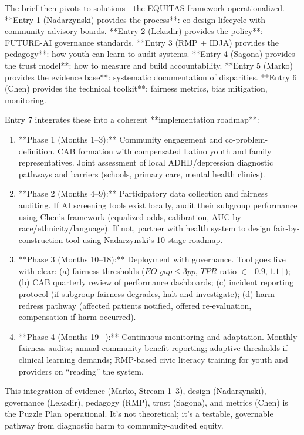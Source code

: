 \documentclass[12pt,twoside]{article}
\DeclareRobustCommand{\EOgap}{EO\text{-}gap\xspace}
\DeclareRobustCommand{\TPR}{TPR\xspace}
\DeclareRobustCommand{\pp}{pp\xspace}
\begin{document}
The brief then pivots to solutions---the EQUITAS framework operationalized. **Entry 1 (Nadarzynski) provides the process**: co-design lifecycle with community advisory boards. **Entry 2 (Lekadir) provides the policy**: FUTURE-AI governance standards. **Entry 3 (RMP + IDJA) provides the pedagogy**: how youth can learn to audit systems. **Entry 4 (Sagona) provides the trust model**: how to measure and build accountability. **Entry 5 (Marko) provides the evidence base**: systematic documentation of disparities. **Entry 6 (Chen) provides the technical toolkit**: fairness metrics, bias mitigation, monitoring.

Entry 7 integrates these into a coherent **implementation roadmap**: 

\begin{enumerate}
\item **Phase 1 (Months 1--3):** Community engagement and co-problem-definition. CAB formation with compensated Latino youth and family representatives. Joint assessment of local ADHD/depression diagnostic pathways and barriers (schools, primary care, mental health clinics).

\item **Phase 2 (Months 4--9):** Participatory data collection and fairness auditing. If AI screening tools exist locally, audit their subgroup performance using Chen's framework (equalized odds, calibration, AUC by race/ethnicity/language). If not, partner with health system to design fair-by-construction tool using Nadarzynski's 10-stage roadmap.

\item **Phase 3 (Months 10--18):** Deployment with governance. Tool goes live with clear: (a) fairness thresholds ($\EOgap \le 3\pp$, $\TPR$ ratio $\in [0.9,1.1]$); (b) CAB quarterly review of performance dashboards; (c) incident reporting protocol (if subgroup fairness degrades, halt and investigate); (d) harm-redress pathway (affected patients notified, offered re-evaluation, compensation if harm occurred).

\item **Phase 4 (Months 19+):** Continuous monitoring and adaptation. Monthly fairness audits; annual community benefit reporting; adaptive thresholds if clinical learning demands; RMP-based civic literacy training for youth and providers on ``reading'' the system.
\end{enumerate}

This integration of evidence (Marko, Stream 1--3), design (Nadarzynski), governance (Lekadir), pedagogy (RMP), trust (Sagona), and metrics (Chen) is the Puzzle Plan operational. It's not theoretical; it's a testable, governable pathway from diagnostic harm to community-audited equity.
\end{document}
